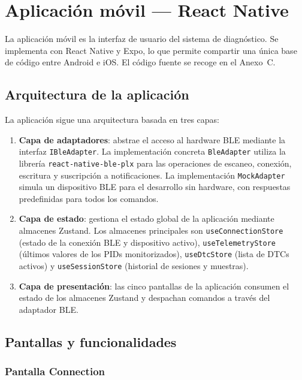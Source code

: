 \section{Aplicación móvil — React Native}
\label{sec:app_movil}

La aplicación móvil es la interfaz de usuario del sistema de diagnóstico. Se implementa con React Native y Expo, lo que permite compartir una única base de código entre Android e iOS. El código fuente se recoge en el Anexo~C.


\subsection{Arquitectura de la aplicación}

La aplicación sigue una arquitectura basada en tres capas:

\begin{enumerate}
    \item \textbf{Capa de adaptadores}: abstrae el acceso al hardware BLE mediante la interfaz \texttt{IBleAdapter}. La implementación concreta \texttt{BleAdapter} utiliza la librería \texttt{react-native-ble-plx} para las operaciones de escaneo, conexión, escritura y suscripción a notificaciones. La implementación \texttt{MockAdapter} simula un dispositivo BLE para el desarrollo sin hardware, con respuestas predefinidas para todos los comandos.

    \item \textbf{Capa de estado}: gestiona el estado global de la aplicación mediante almacenes Zustand. Los almacenes principales son \texttt{useConnectionStore} (estado de la conexión BLE y dispositivo activo), \texttt{useTelemetryStore} (últimos valores de los PIDs monitorizados), \texttt{useDtcStore} (lista de DTCs activos) y \texttt{useSessionStore} (historial de sesiones y muestras).

    \item \textbf{Capa de presentación}: las cinco pantallas de la aplicación consumen el estado de los almacenes Zustand y despachan comandos a través del adaptador BLE.
\end{enumerate}


\subsection{Pantallas y funcionalidades}

\subsubsection{Pantalla Connection}

